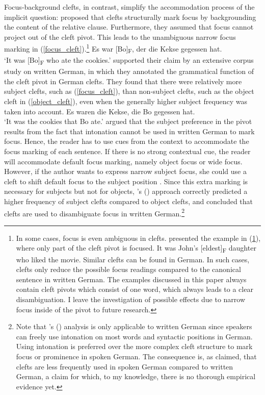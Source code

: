 \documentclass[output=paper,colorlinks,citecolor=brown]{langscibook}
\begin{document}
Focus-background clefts, in contrast, simplify the accommodation process of the implicit question: \citet{deveaugh-geiss_et_al_2015} proposed that clefts structurally mark focus by backgrounding the content of the relative clause. Furthermore, they assumed that focus cannot project out of the cleft pivot. This leads to the unambiguous narrow focus marking in (\ref{focus_cleft}).\footnote{In some cases, focus is even ambiguous in clefts. \citet[442]{velleman_et_al_2012} presented the example in (\ref{focus_partly}), where only part of the cleft pivot is focused.
\ea\label{focus_partly} It was John’s [eldest]\textsubscript{F} daughter who liked the movie.
\z
Similar clefts can be found in German. In such cases, clefts only reduce the possible focus readings compared to the canonical sentence in written German. The examples discussed in this paper always contain cleft pivots which consist of one word, which always leads to a clear disambiguation. I leave the investigation of possible effects due to narrow focus inside of the pivot to future research.
}
\ea\label{focus_cleft} Es war [Bo]\textsubscript{F}, der die Kekse gegessen hat.\\
`It was [Bo]\textsubscript{F} who ate the cookies.'
\z
\citet{tonnis_et_al_2018} supported their claim by an extensive corpus study on written German, in which they annotated the grammatical function of the cleft pivot in German clefts. They found that there were relatively more subject clefts, such as (\ref{focus_cleft}), than non-subject clefts, such as the object cleft in (\ref{object_cleft}), even when the generally higher subject frequency was taken into account.
\ea\label{object_cleft} Es waren die Kekse, die Bo gegessen hat.\\
`It was the cookies that Bo ate.'
\z
\citet{tonnis_et_al_2018} argued that the subject preference in the pivot results from the fact that intonation cannot be used in written German to mark focus. Hence, the reader has to use cues from the context to accommodate the focus marking of each sentence. If there is no strong contextual cue, the reader will accommodate default focus marking, namely object focus or wide focus. However, if the author wants to express narrow subject focus, she could use a cleft to shift default focus to the subject position \citep[e.g.,][]{reinhart_1995,szendroi_1999}. Since this extra marking is necessary for subjects but not for objects, \citeauthor{tonnis_et_al_2018}'s (\citeyear{tonnis_et_al_2018}) approach correctly predicted a higher frequency of subject clefts compared to object clefts, and concluded that clefts are used to disambiguate focus in written German.\footnote{Note that \citeauthor{tonnis_et_al_2018}'s (\citeyear{tonnis_et_al_2018}) analysis is only applicable to written German since speakers can freely use intonation on most words and syntactic positions in German. Using intonation is preferred over the more complex cleft structure to mark focus or prominence in spoken German. The consequence is, as \citet{tonnis_et_al_2018} claimed, that clefts are less frequently used in spoken German compared to written German, a claim for which, to my knowledge, there is no thorough empirical evidence yet.}
\end{document}
